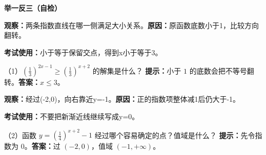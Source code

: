 \clearpage
\begin{examplebox}
\textbf{\textcolor{CExample}{举一反三（自检）}}

\textbf{观察：}两条指数直线在哪一侧满足大小关系。\quad\textbf{原因：}原函数底数小于1，比较方向翻转。

\textbf{考试使用：}小于等于保留交点，得到x小于等于3。



（1）$\left(\frac13\right)^{2x-1}\geq\left(\frac13\right)^{x+2}$ 的解集是什么？
\textbf{提示：}小于 $1$ 的底数会把不等号翻转。\textbf{答案：}$x\leq3$。

\end{examplebox}
\clearpage
\begin{examplebox}


\textbf{观察：}经过(-2,0)，向右靠近y=-1。\quad\textbf{原因：}正的指数项整体减1后仍大于-1。

\textbf{考试使用：}不要把新渐近线继续写成y=0。

（2）函数 $y=(\frac14)^{x+2}-1$ 经过哪个容易确定的点？值域是什么？
\textbf{提示：}先令指数为 $0$。\textbf{答案：}过 $(-2,0)$，值域 $(-1,+\infty)$。

\end{examplebox}
